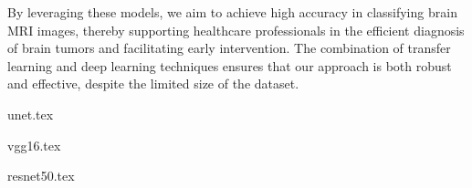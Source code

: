By leveraging these models, we aim to achieve high accuracy in classifying brain MRI images, thereby supporting healthcare professionals in the efficient diagnosis of brain tumors and facilitating early intervention. The combination of transfer learning and deep learning techniques ensures that our approach is both robust and effective, despite the limited size of the dataset.


{unet.tex}

{vgg16.tex}

{resnet50.tex}
